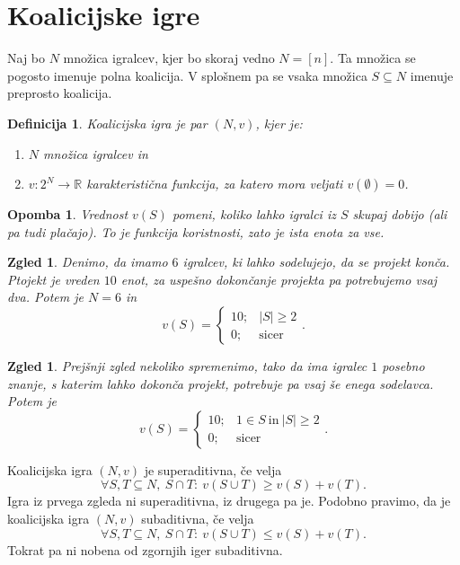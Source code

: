 \documentclass[10pt, a4paper]{article}
\newtheorem{defi}[izr]{Definicija}
\newenvironment{noticeB}{%
  \tcolorbox[%
  notitle,
  empty,
  enhanced,  %
  breakable,
  coltext=black,
  colback=white, 
  fontupper=\rmfamily,
  parbox=false,
  noparskip,
  sharp corners,
  boxrule=-1pt,  %
  frame hidden,
  left=7pt,  %
  right=7pt,
  top=5pt,
  bottom=5pt,
  before skip=2.5ex plus 2pt,
  after skip=2.5ex plus 2pt,
  borderline west = {1.5pt}{-0.1pt}{blue!30!black}, %
  overlay unbroken and last={%
    \draw[color=black, line width=1.25pt]
    ($(frame.south west)+(1.pt, -0.1pt)$) -- ++(2em, 0);
  }
  ]}
{\endtcolorbox}
\newenvironment{definicija}{\begin{defi}\begin{noticeB}}{%
    \end{noticeB}\end{defi}}
\newtheorem*{opomba}{Opomba}
\newtheorem{zgled}[izr]{Zgled}
\newcommand{\R}{\mathbb {R}}
\begin{document}
\section{Koalicijske igre}

Naj bo $N$ množica igralcev, kjer bo skoraj vedno $N = [n]$.
Ta množica se pogosto imenuje polna koalicija. V splošnem pa se vsaka množica $S \subseteq N$
imenuje preprosto koalicija.

\begin{definicija}
  Koalicijska igra je par $(N, v)$, kjer je:
  \begin{enumerate}
    \item $N$ množica igralcev in
    \item $v: 2^N \to \R$ karakteristična funkcija, za katero mora veljati $v(\emptyset) = 0$.
  \end{enumerate}
\end{definicija}

\begin{opomba}
  Vrednost $v(S)$ pomeni, koliko lahko igralci iz $S$ skupaj dobijo (ali pa tudi plačajo).
  To je funkcija koristnosti, zato je ista enota za vse.
\end{opomba}

\begin{zgled}
  Denimo, da imamo $6$ igralcev, ki lahko sodelujejo, da se projekt konča.
  Ptojekt je vreden $10$ enot, za uspešno dokončanje projekta pa potrebujemo vsaj dva.
  Potem je $N = 6$ in 
  $$v(S) = \begin{cases}
    10;& |S| \geq 2\\
    0;& \text{sicer}
  \end{cases}.$$
\end{zgled}

\begin{zgled}
  Prejšnji zgled nekoliko spremenimo, tako da ima igralec $1$ posebno znanje, s katerim lahko dokonča projekt,
  potrebuje pa vsaj še enega sodelavca. Potem je 
  $$v(S) = \begin{cases}
    10;& 1 \in S\ \text{in}\ |S| \geq 2\\
    0;& \text{sicer}
  \end{cases}.$$
\end{zgled}

Koalicijska igra $(N, v)$ je superaditivna, če velja 
$$\forall S, T \subseteq N,\ S \cap T:\ v(S \cup T) \geq v(S) + v(T).$$
Igra iz prvega zgleda ni superaditivna, iz drugega pa je.
Podobno pravimo, da je koalicijska igra $(N, v)$ subaditivna, če velja 
$$\forall S, T \subseteq N,\ S \cap T:\ v(S \cup T) \leq v(S) + v(T).$$
Tokrat pa ni nobena od zgornjih iger subaditivna.
\end{document}
